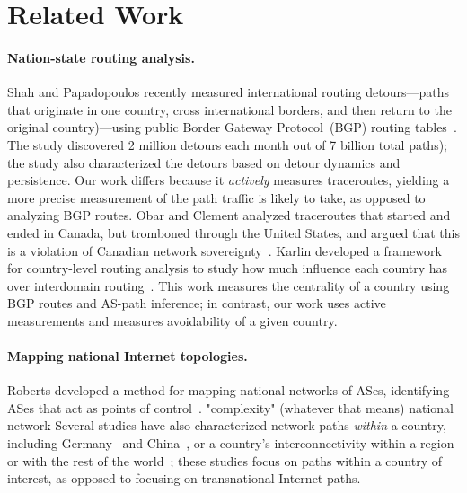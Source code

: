 \section{Related Work}
\label{related}

\paragraph{Nation-state routing analysis.}  Shah and
Papadopoulos recently measured international routing detours---paths that originate
in
one country, cross international borders, and then return to the
original country)---using public Border Gateway Protocol~(BGP) routing tables~\cite
{shah2015characterizing}. 
The study discovered 2 million detours each month out
of 7 billion total paths); the study also characterized the detours based
on detour dynamics and persistence.  Our work differs because it {\em actively}
measures traceroutes, yielding a more precise measurement of the path traffic is
likely to take, as opposed to analyzing BGP
routes.  Obar and Clement analyzed traceroutes
that started and ended in Canada, but tromboned through the United
States, and argued that
this is a violation of Canadian network
sovereignty~\cite{obar2012internet}. 
Karlin \ea developed a framework for country-level
routing analysis to study how much influence each country has over
interdomain routing~\cite{karlin2009nation}.  This work measures the
centrality of a country using BGP routes and AS-path inference; in contrast, our work uses active 
measurements and measures avoidability of a given country. 

\paragraph{Mapping national Internet topologies.}  Roberts \ea developed a method
for mapping national networks of ASes, identifying ASes that act as points of
control~\cite{roberts2011mapping}.   %
"complexity" (whatever that means) %
national network Several studies have also characterized network paths {\em
within} a country, including
Germany~\cite{wahlisch2010framework,wahlisch2012exposing} and
China~\cite{zhou2007chinese}, or a country's interconnectivity within a region
or with the rest of the
world~\cite{bischof2015and,gupta2014peering,fanou2015diversity}; these studies
focus on paths within a country of interest, as opposed to focusing on
transnational Internet paths.

